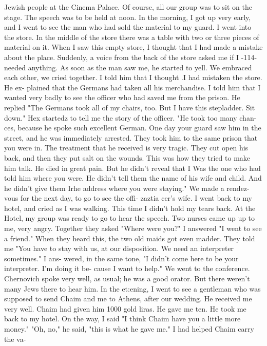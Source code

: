 Jewish people at the Cinema Palace.
Of course, all our group was to sit on the stage.
The speech was to be held at noon.
In the morning, I got up very early, and I went to 
see the man who had sold the material to my guard.
I went into the store.
In the middle of the store there was a table with two or 
three pieces of material on it.
When I saw this empty store, I thought that I had made 
a mistake about the place.
Suddenly, a voice from the back of the store asked me if I 
-114- 
needed anything.
As soon as the man saw me, he started to yell.
We embraced each 
other, we cried together.
I told him that I thought .I had mistaken the store.
He ex-
plained that the Germans had taken all his merchandise.
I told him that I wanted very badly to see the officer who had saved me from the 
prison.
He replied "The Germans took all of my chairs, too.
But I have this stepladder.
Sit down."
Hex startedz to tell me the story of the officer.
"He took too many chan-
ces, because he spoke such excellent German.
One day your guard saw him in the street, 
and he was immediately arrested.
They took him to the same prison that you were in.
The treatment that he received is very tragic.
They cut open his back, and then they 
put salt on the wounds.
This was how they tried to make him talk.
He died in great 
pain.
But he didn't reveal that I Was the one who had told him where you were.
He 
didn't tell them the name of his wife and child.
And he didn't give them Irhe address 
where you were staying."
We made a rendez-vous for the next day, to go to see the offi-
zaztia cer's wife.
I went back to my hotel, and cried as I was walking.
This time I didn't hold my 
tears back.
At the Hotel, my group was ready to go to hear the speech.
Two nurses came up 
up to me, very angry.
Together they asked "Where were you?"
I answered "I went to see 
a friend."
When they heard this, the two old maids got even madder.
They told me "You 
have to stay with us, at our disposition.
We need an interpreter sometimes."
I ans-
wered, in the same tone, "I didn't come here to be your interpreter.
I'm doing it be-
cause I want to help."
We went to the conference.
Chernovich spoke very well, as usual; he was a good 
orator.
But there weren't many Jews there to hear him.
In the et:ening, I went to 
see a gentleman who was supposed to send Chaim and me to Athens, after our wedding.
He received me very well.
Chaim had given him 1000 gold liras.
He gave me ten.
He 
took me back to my hotel.
On the way, I said "I think Chaim have you a little more 
money."
"Oh, no," he said, "this is what he gave me."
I had helped Chaim carry the va-
